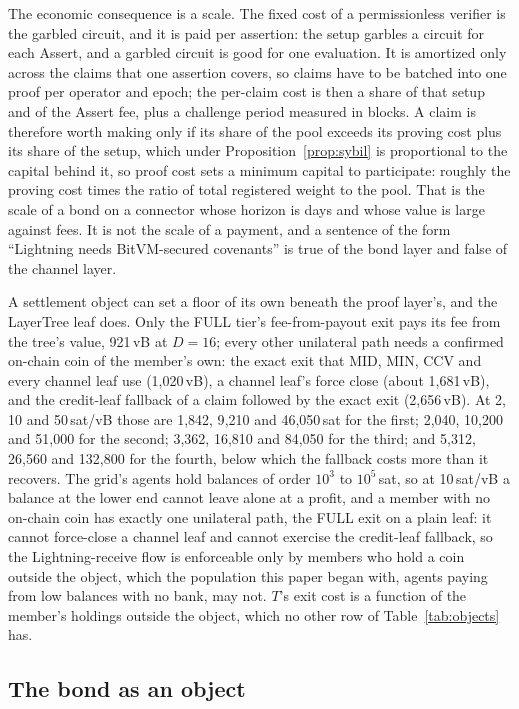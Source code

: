 \documentclass[11pt]{article}
\theoremstyle{plain}
\theoremstyle{definition}
\theoremstyle{remark}
\begin{document}
The economic consequence is a scale. The fixed cost of a permissionless verifier is the garbled circuit, and it is paid per assertion: the setup garbles a circuit for each Assert, and a garbled circuit is good for one evaluation. It is amortized only across the claims that one assertion covers, so claims have to be batched into one proof per operator and epoch; the per-claim cost is then a share of that setup and of the Assert fee, plus a challenge period measured in blocks. A claim is therefore worth making only if its share of the pool exceeds its proving cost plus its share of the setup, which under Proposition~\ref{prop:sybil} is proportional to the capital behind it, so proof cost sets a minimum capital to participate: roughly the proving cost times the ratio of total registered weight to the pool. That is the scale of a bond on a connector whose horizon is days and whose value is large against fees. It is not the scale of a payment, and a sentence of the form ``Lightning needs BitVM-secured covenants'' is true of the bond layer and false of the channel layer.

A settlement object can set a floor of its own beneath the proof layer's, and the LayerTree leaf does. Only the FULL tier's fee-from-payout exit pays its fee from the tree's value, 921\,vB at $D=16$; every other unilateral path needs a confirmed on-chain coin of the member's own: the exact exit that MID, MIN, CCV and every channel leaf use (1{,}020\,vB), a channel leaf's force close (about 1{,}681\,vB), and the credit-leaf fallback of a claim followed by the exact exit (2{,}656\,vB). At 2, 10 and 50\,sat/vB those are 1{,}842, 9{,}210 and 46{,}050\,sat for the first; 2{,}040, 10{,}200 and 51{,}000 for the second; 3{,}362, 16{,}810 and 84{,}050 for the third; and 5{,}312, 26{,}560 and 132{,}800 for the fourth, below which the fallback costs more than it recovers. The grid's agents hold balances of order $10^3$ to $10^5$\,sat, so at 10\,sat/vB a balance at the lower end cannot leave alone at a profit, and a member with no on-chain coin has exactly one unilateral path, the FULL exit on a plain leaf: it cannot force-close a channel leaf and cannot exercise the credit-leaf fallback, so the Lightning-receive flow is enforceable only by members who hold a coin outside the object, which the population this paper began with, agents paying from low balances with no bank, may not. $T$'s exit cost is a function of the member's holdings outside the object, which no other row of Table~\ref{tab:objects} has.

\subsection{The bond as an object}
\label{sec:bond}
\end{document}

